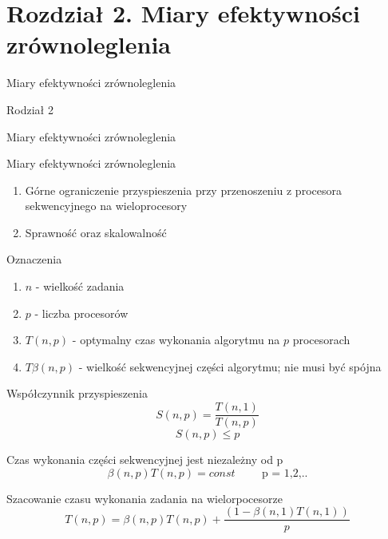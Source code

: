 \documentclass{beamer}
\begin{document}
\section{Rozdział 2. Miary efektywności zrównoleglenia}

\begin{frame}{Miary efektywności zrównoleglenia}
  \huge
  \begin{center}
    Rodział 2

    Miary efektywności zrównoleglenia
  \end{center}
\end{frame}

\begin{frame}{Miary efektywności zrównoleglenia}
  \begin{enumerate}
  \item Górne ograniczenie przyspieszenia przy przenoszeniu z procesora sekwencyjnego na wieloprocesory
  \item Sprawność oraz skalowalność
  \end{enumerate}
\end{frame}

\begin{frame}{Oznaczenia}
  \begin{enumerate}
  \item $n$ - wielkość zadania
  \item $p$ - liczba procesorów
  \item $T(n,p)$ - optymalny czas wykonania algorytmu na $p$ procesorach
  \item $T\beta(n,p)$ - wielkość sekwencyjnej części algorytmu; nie musi być spójna
  \end{enumerate}
\end{frame}

\begin{frame}{Współczynnik przyspieszenia}
  $$ S(n,p) = \frac{T(n,1)}{T(n,p)} $$
  $$ S(n,p) \leq p$$
\end{frame}

\begin{frame}{Czas wykonania części sekwencyjnej jest niezależny od p}
  $$ \beta(n,p) T(n, p) = const \hspace{1cm}\mbox{p = 1,2,..} $$
\end{frame}

\begin{frame}{Szacowanie czasu wykonania zadania na wielorpocesorze}
  $$ T(n,p) = \beta(n,p) T(n,p) + \frac{(1-\beta(n,1) T(n,1))}{p} $$
\end{frame}
\end{document}
